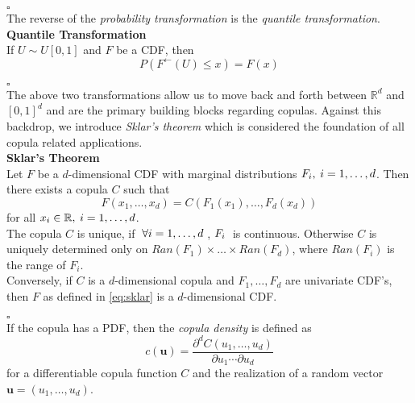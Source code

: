 \hfill $\square$ \\

The reverse of the \textit{probability transformation} is the \textit{quantile transformation}.\\

\textbf{Quantile Transformation}\\
If $U \sim U[0,1]$ and $F$ be a \ac{CDF}, then
\begin{equation}
P\left(F^{\leftarrow}(U) \leq x\right)=F(x)
\label{eq:quantile_transformation}
\end{equation}

\hfill $\square$ \\

The above two transformations allow us to move back and forth between $\mathbb{R}^d$ and $[0,1]^d$ and are the primary building blocks regarding copulas. Against this backdrop, we introduce \textit{Sklar's theorem} which is considered the foundation of all copula related applications.\\




\textbf{Sklar's Theorem} \citep{sklar1959fonctions} \\
Let $F$ be a $d$-dimensional \ac{CDF} with marginal distributions $F_{i}, \hspace{0.25em} i = 1, \ldots, d$.
Then there exists a copula $C$ such that
\begin{equation}
F(x_1, \ldots, x_d) = C (F_1(x_1), \ldots, F_d(x_d))
\label{eq:sklar}
\end{equation}
for all $x_i \in \mathbb{R}, \hspace{0.25em} i = 1, \ldots, d $.\\
The copula $C$ is unique, if $ \hspace{0.25em} \forall i = 1, \ldots, d \hspace{0.25em}$,  $F_i \hspace{0.25em}$  is continuous. Otherwise $C$ is uniquely determined only on
$Ran(F_1) \times \ldots \times Ran(F_d)$, where $Ran(F_{i})$ is the range of $F_i$.\\
Conversely, if $C$ is a $d$-dimensional copula and $F_1, \ldots, F_d$ are univariate \ac{CDF}'s, then $F$ as defined in \autoref{eq:sklar} is a 
$d$-dimensional \ac{CDF}.

\hfill $\square$ \\


If the copula has a \ac{PDF}, then the \textit{copula density} is defined as
\begin{equation}
c(\mathbf{u})=\frac{\partial^{d} C\left(u_{1}, \ldots, u_{d}\right)}{\partial u_{1} \cdots \partial u_{d}} 
\label{eq:copula_density_1}
\end{equation}
for a differentiable copula function $C$ and the realization of a random vector $ \bm{u} = (u_1, \ldots, u_d)$.\\


